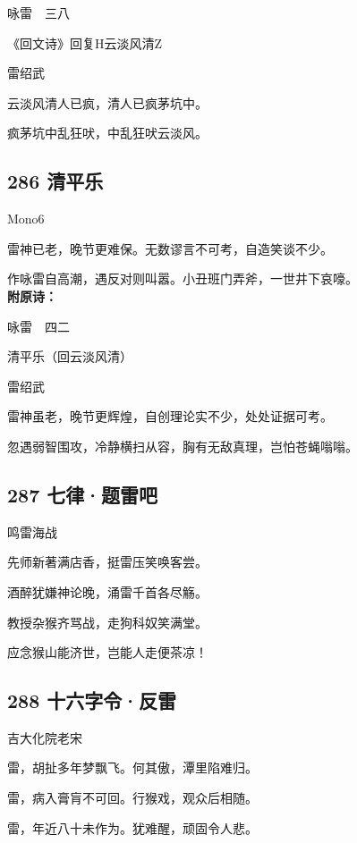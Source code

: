 咏雷~~三八

《回文诗》回复H云淡风清Z

雷绍武

云淡风清人已疯，清人已疯茅坑中。

疯茅坑中乱狂吠，中乱狂吠云淡风。

\hypertarget{ux6e05ux5e73ux4e50}{%
\subsection{286 清平乐}\label{ux6e05ux5e73ux4e50}}

{Mono6}

雷神已老，晚节更难保。无数谬言不可考，自造笑谈不少。

作咏雷自高潮，遇反对则叫嚣。小丑班门弄斧，一世井下哀嚎。 ~\\
\textbf{附原诗：}

咏雷~~四二

清平乐（回云淡风清）

雷绍武

雷神虽老，晚节更辉煌，自创理论实不少，处处证据可考。

忽遇弱智围攻，冷静横扫从容，胸有无敌真理，岂怕苍蝇嗡嗡。

\hypertarget{ux4e03ux5f8bux9898ux96f7ux5427}{%
\subsection{287 七律·题雷吧}\label{ux4e03ux5f8bux9898ux96f7ux5427}}

{鸣雷海战}

先师新著满店香，挺雷压笑唤客尝。

酒醉犹嫌神论晚，涌雷千首各尽觞。

教授杂猴齐骂战，走狗科奴笑满堂。

应念猴山能济世，岂能人走便茶凉！

\hypertarget{ux5341ux516dux5b57ux4ee4ux53cdux96f7}{%
\subsection{288
十六字令·反雷}\label{ux5341ux516dux5b57ux4ee4ux53cdux96f7}}

{吉大化院老宋}

雷，胡扯多年梦飘飞。何其傲，潭里陷难归。

雷，病入膏肓不可回。行猴戏，观众后相随。

雷，年近八十未作为。犹难醒，顽固令人悲。

~\\

